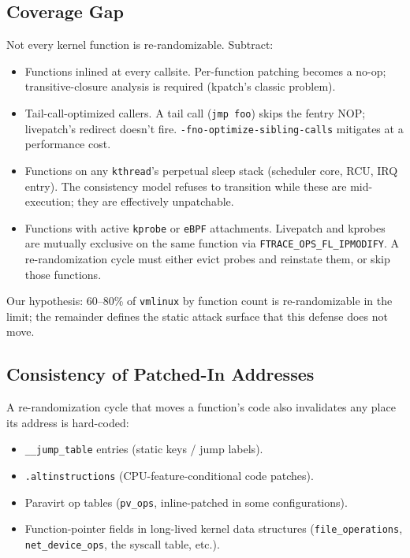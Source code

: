 \documentclass[10pt,letterpaper]{article}
\begin{document}
\subsection{Coverage Gap}

Not every kernel function is re-randomizable. Subtract:

\begin{itemize}[leftmargin=*]
\item Functions inlined at every callsite. Per-function patching
becomes a no-op; transitive-closure analysis is required (kpatch's
classic problem).
\item Tail-call-optimized callers. A tail call (\texttt{jmp foo})
skips the fentry NOP; livepatch's redirect doesn't fire.
\texttt{-fno-optimize-sibling-calls} mitigates at a performance
cost.
\item Functions on any \texttt{kthread}'s perpetual sleep stack
(scheduler core, RCU, IRQ entry). The consistency model refuses to
transition while these are mid-execution; they are effectively
unpatchable.
\item Functions with active \texttt{kprobe} or \texttt{eBPF} attachments.
Livepatch and kprobes are mutually exclusive on the same function via
\texttt{FTRACE\_OPS\_FL\_IPMODIFY}. A re-randomization cycle must
either evict probes and reinstate them, or skip those functions.
\end{itemize}

Our hypothesis: 60--80\% of \texttt{vmlinux} by function count is
re-randomizable in the limit; the remainder defines the static
attack surface that this defense does not move.

\subsection{Consistency of Patched-In Addresses}

A re-randomization cycle that moves a function's code also
invalidates any place its address is hard-coded:

\begin{itemize}[leftmargin=*]
\item \texttt{\_\_jump\_table} entries (static keys / jump labels).
\item \texttt{.altinstructions} (CPU-feature-conditional code
patches).
\item Paravirt op tables (\texttt{pv\_ops}, inline-patched in
some configurations).
\item Function-pointer fields in long-lived kernel data
structures (\texttt{file\_operations}, \texttt{net\_device\_ops}, the
syscall table, etc.).
\end{itemize}
\end{document}
